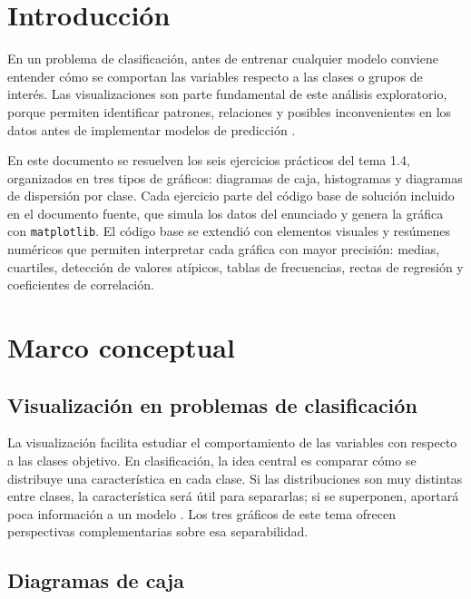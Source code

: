 \documentclass[11pt,letterpaper]{article}
\begin{document}
\portada
\indicegeneral


\section{Introducción}

En un problema de clasificación, antes de entrenar cualquier modelo conviene entender cómo se comportan las variables respecto a las clases o grupos de interés. Las visualizaciones son parte fundamental de este análisis exploratorio, porque permiten identificar patrones, relaciones y posibles inconvenientes en los datos antes de implementar modelos de predicción \parencite{tecnm2026_documento_fuente,brownlee2019}.

En este documento se resuelven los seis ejercicios prácticos del tema 1.4, organizados en tres tipos de gráficos: diagramas de caja, histogramas y diagramas de dispersión por clase. Cada ejercicio parte del código base de solución incluido en el documento fuente, que simula los datos del enunciado y genera la gráfica con \texttt{matplotlib}. El código base se extendió con elementos visuales y resúmenes numéricos que permiten interpretar cada gráfica con mayor precisión: medias, cuartiles, detección de valores atípicos, tablas de frecuencias, rectas de regresión y coeficientes de correlación.

\section{Marco conceptual}

\subsection{Visualización en problemas de clasificación}

La visualización facilita estudiar el comportamiento de las variables con respecto a las clases objetivo. En clasificación, la idea central es comparar cómo se distribuye una característica en cada clase. Si las distribuciones son muy distintas entre clases, la característica será útil para separarlas; si se superponen, aportará poca información a un modelo \parencite{tecnm2026_documento_fuente}. Los tres gráficos de este tema ofrecen perspectivas complementarias sobre esa separabilidad.

\subsection{Diagramas de caja}
\end{document}
